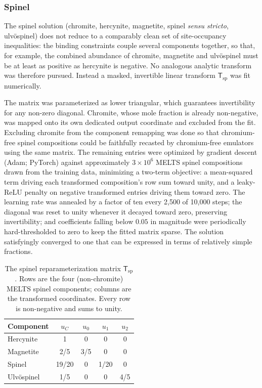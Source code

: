 \subsubsection{Spinel} The spinel solution (chromite, hercynite, magnetite, spinel
\emph{sensu stricto}, ulv\"ospinel) does not reduce to a comparably clean set of
site-occupancy inequalities: the binding constraints couple several components
together, so that, for example, the combined abundance of chromite, magnetite and
ulv\"ospinel must be at least as positive as hercynite is negative. No analogous
analytic transform was therefore pursued. Instead a masked, invertible linear
transform $\mathsf{T}_{\mathrm{sp}}$ was fit numerically.

The matrix was parameterized as lower triangular, which guarantees invertibility for
any non-zero diagonal. Chromite, whose mole fraction is already non-negative, was
mapped onto its own dedicated output coordinate and excluded from the fit. Excluding 
chromite from the component remapping was done so that chromium-free spinel compositions 
could be faithfully recasted by chromium-free emulators using the same matrix. The
remaining entries were optimized by gradient descent (Adam; PyTorch) against
approximately $3\times10^{6}$ \textsc{MELTS} spinel compositions drawn from the
training data, minimizing a two-term objective: a mean-squared term driving each
transformed composition's row sum toward unity, and a leaky-ReLU penalty on negative
transformed entries driving them toward zero. The learning rate was annealed by a
factor of ten every 2{,}500 of 10{,}000 steps; the diagonal was reset to unity
whenever it decayed toward zero, preserving invertibility; and coefficients falling
below $0.05$ in magnitude were periodically hard-thresholded to zero to keep the
fitted matrix sparse. The solution satisfyingly converged to one that can be expressed 
in terms of relatively simple fractions.

\begin{table}[t]
\centering
\caption{The spinel reparameterization matrix $\mathsf{T}_{\mathrm{sp}}$. Rows are
the four (non-chromite) \textsc{MELTS} spinel components; columns are the transformed
coordinates. Every row is non-negative and sums to unity.}
\label{tab:spmatrix}
\begin{tabular}{lcccc}
\toprule
Component & $u_C$ & $u_0$ & $u_1$ & $u_2$ \\
\midrule
Hercynite          & 1   & 0   & 0   & 0 \\
Magnetite    & 2/5 & 3/5   & 0   & 0 \\
Spinel      & 19/20 & 0  & 1/20   & 0 \\
Ulv\"ospinel & 1/5 & 0   & 0  & 4/5 \\
\bottomrule
\end{tabular}
\end{table}

